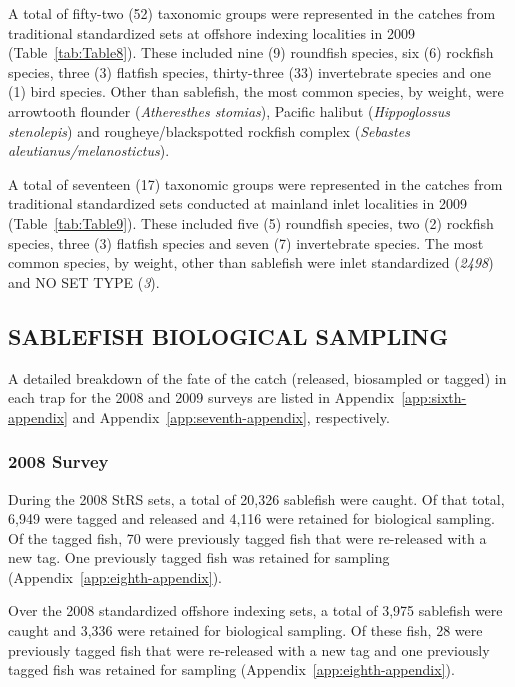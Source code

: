 \documentclass[12pt]{article}\usepackage[]{graphicx}\usepackage[]{color}
\begin{document}
A total of fifty-two (52) taxonomic groups were represented in the catches from traditional standardized sets at offshore indexing localities in 2009 (Table~\ref{tab:Table8}). These included nine (9) roundfish species, six (6) rockfish species, three (3) flatfish species, thirty-three (33) invertebrate species and one (1) bird species. Other than sablefish, the most common species, by weight, were arrowtooth flounder (\emph{Atheresthes stomias}), Pacific halibut (\emph{Hippoglossus stenolepis}) and rougheye/blackspotted rockfish complex (\emph{Sebastes aleutianus/melanostictus}).

A total of seventeen (17) taxonomic groups were represented in the catches from traditional standardized sets conducted at mainland inlet localities in 2009 (Table~\ref{tab:Table9}). These included five (5) roundfish species, two (2) rockfish species, three (3) flatfish species and seven (7) invertebrate species. The most common species, by weight, other than sablefish were inlet standardized (\emph{2498}) and NO SET TYPE (\emph{3}).

\hypertarget{sablefish-biological-sampling}{%
\subsection{SABLEFISH BIOLOGICAL SAMPLING}\label{sablefish-biological-sampling}}

A detailed breakdown of the fate of the catch (released, biosampled or tagged) in each trap for the 2008 and 2009 surveys are listed in Appendix~\ref{app:sixth-appendix} and Appendix~\ref{app:seventh-appendix}, respectively.

\hypertarget{survey-2}{%
\subsubsection{2008 Survey}\label{survey-2}}

During the 2008 StRS sets, a total of 20,326 sablefish were caught. Of that total, 6,949 were tagged and released and 4,116 were retained for biological sampling. Of the tagged fish, 70 were previously tagged fish that were re-released with a new tag. One previously tagged fish was retained for sampling (Appendix~\ref{app:eighth-appendix}).

Over the 2008 standardized offshore indexing sets, a total of 3,975 sablefish were caught and 3,336 were retained for biological sampling. Of these fish, 28 were previously tagged fish that were re-released with a new tag and one previously tagged fish was retained for sampling (Appendix~\ref{app:eighth-appendix}).
\end{document}
